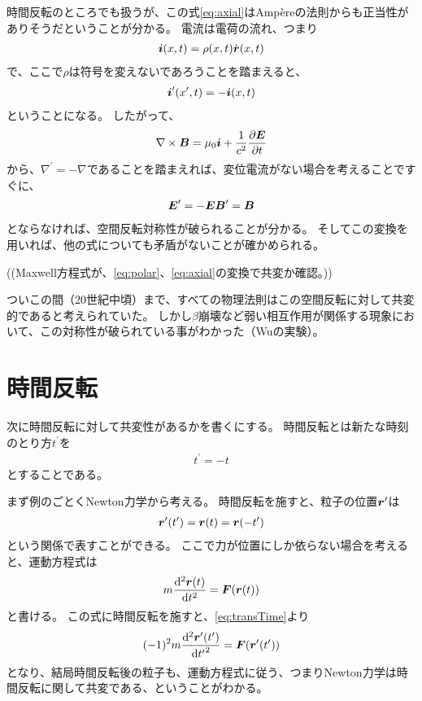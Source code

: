 \documentclass[a4paper]{jsarticle}
\def\vec#1{\mbox{\boldmath $#1$}}
\newcommand{\dif}[2]{\frac{{\rm d} #1}{{\rm d} #2}}
\newcommand{\pdif}[2]{\frac{\partial #1}{\partial #2}}
\begin{document}
時間反転のところでも扱うが、この式\eqref{eq:axial}はAmp\`{e}reの法則からも正当性がありそうだということが分かる。
電流は電荷の流れ、つまり
\begin{align}
	\vec{i}(x, t) = \rho(x, t) \dot{\vec{r}}(x, t)
\end{align}
で、ここで$\rho$は符号を変えないであろうことを踏まえると、
\begin{align}
	\vec{i}^{\prime}(x^{\prime}, t) = -\vec{i}(x, t)
\end{align}
ということになる。
したがって、
\begin{align}
	\nabla \times \vec{B} = \mu_0 \vec{i} + \frac{1}{c^2} \pdif{\vec{E}}{t}
\end{align}
から、$\nabla^{\prime} = -\nabla$であることを踏まえれば、変位電流がない場合を考えることですぐに、
\begin{align}
	\vec{E}^{\prime} = -\vec{E}
	\vec{B}^{\prime} = \vec{B}
\end{align}
とならなければ、空間反転対称性が破られることが分かる。
そしてこの変換を用いれば、他の式についても矛盾がないことが確かめられる。

((Maxwell方程式が、\eqref{eq:polar}、\eqref{eq:axial}の変換で共変か確認。))

ついこの間（20世紀中頃）まで、すべての物理法則はこの空間反転に対して共変的であると考えられていた。
しかし$\beta$崩壊など弱い相互作用が関係する現象において、この対称性が破られている事がわかった（Wuの実験）。

\section{時間反転}
次に時間反転に対して共変性があるかを書くにする。
時間反転とは新たな時刻のとり方$t^{\prime}$を
\begin{align}
	t^{\prime} = -t \label{eq:transTime}
\end{align}
とすることである。

まず例のごとくNewton力学から考える。
時間反転を施すと、粒子の位置$\vec{r}^{\prime}$は
\begin{align}
	\vec{r}^{\prime}(t^{\prime}) = \vec{r}(t) = \vec{r}(-t^{\prime})
	\label{eq:timeTransPosition}
\end{align}
という関係で表すことができる。
ここで力が位置にしか依らない場合を考えると、運動方程式は
\begin{align}
	m \dif{^2 \vec{r}(t)}{t^2} = \vec{F}(\vec{r}(t))
\end{align}
と書ける。
この式に時間反転を施すと、\eqref{eq:transTime}より
\begin{align}
	(-1)^2 m \dif{^2 \vec{r}^{\prime}(t^{\prime})}{{t^{\prime}}^2} = \vec{F}(\vec{r}^{\prime}(t^{\prime}))
\end{align}
となり、結局時間反転後の粒子も、運動方程式に従う、つまりNewton力学は時間反転に関して共変である、ということがわかる。
\end{document}
